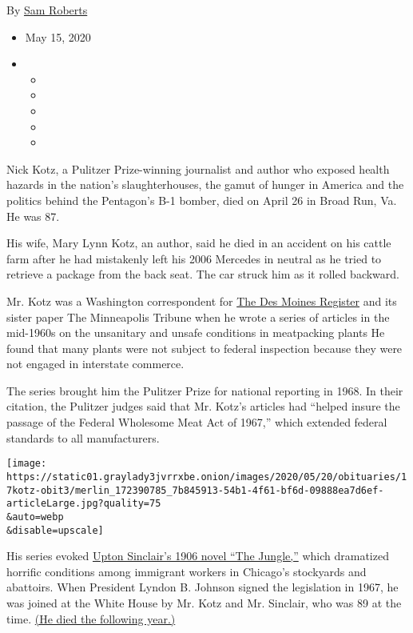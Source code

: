 By \href{https://www.nytimes3xbfgragh.onion/by/sam-roberts}{Sam Roberts}

\begin{itemize}
\item
  May 15, 2020
\item
  \begin{itemize}
  \item
  \item
  \item
  \item
  \item
  \end{itemize}
\end{itemize}

Nick Kotz, a Pulitzer Prize-winning journalist and author who exposed
health hazards in the nation's slaughterhouses, the gamut of hunger in
America and the politics behind the Pentagon's B-1 bomber, died on April
26 in Broad Run, Va. He was 87.

His wife, Mary Lynn Kotz, an author, said he died in an accident on his
cattle farm after he had mistakenly left his 2006 Mercedes in neutral as
he tried to retrieve a package from the back seat. The car struck him as
it rolled backward.

Mr. Kotz was a Washington correspondent for
\href{https://www.desmoinesregister.com/}{The Des Moines Register} and
its sister paper The Minneapolis Tribune when he wrote a series of
articles in the mid-1960s on the unsanitary and unsafe conditions in
meatpacking plants He found that many plants were not subject to federal
inspection because they were not engaged in interstate commerce.

The series brought him the Pulitzer Prize for national reporting in
1968. In their citation, the Pulitzer judges said that Mr. Kotz's
articles had ``helped insure the passage of the Federal Wholesome Meat
Act of 1967,'' which extended federal standards to all manufacturers.

\texttt{[image: https://static01.graylady3jvrrxbe.onion/images/2020/05/20/obituaries/17kotz-obit3/merlin\_172390785\_7b845913-54b1-4f61-bf6d-09888ea7d6ef-articleLarge.jpg?quality=75\\\&auto=webp\\\&disable=upscale]}

His series evoked
\href{https://www.crf-usa.org/bill-of-rights-in-action/bria-24-1-b-upton-sinclairs-the-jungle-muckraking-the-meat-packing-industry.html}{Upton
Sinclair's 1906 novel ``The Jungle,''} which dramatized horrific
conditions among immigrant workers in Chicago's stockyards and
abattoirs. When President Lyndon B. Johnson signed the legislation in
1967, he was joined at the White House by Mr. Kotz and Mr. Sinclair, who
was 89 at the time.
\href{https://www.nytimes3xbfgragh.onion/1968/11/26/archives/upton-sinclair-author-dead-crusader-for-social-justice-90-90-books.html}{(He
died the following year.)}

